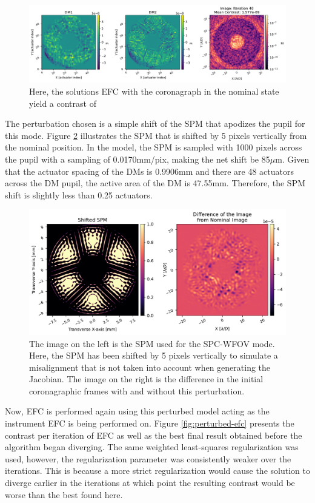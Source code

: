 \documentclass[12pt]{spieman}  %
\begin{document}
\begin{spacing}{2}
\begin{figure}[h]
    \centering
    \includegraphics[scale=0.5]{figs-efc/efc_nominal.pdf}
    \caption{Here, the solutions EFC with the coronagraph in the nominal state yield a contrast of }
    \label{fig:efc-nominal}
\end{figure}

The perturbation chosen is a simple shift of the SPM that apodizes the pupil for this mode. Figure \ref{fig:spm-perturbation} illustrates the SPM that is shifted by 5 pixels vertically from the nominal position. In the model, the SPM is sampled with 1000 pixels across the pupil with a sampling of 0.0170mm/pix, making the net shift be 85$\mu\text{m}$. Given that the actuator spacing of the DMs is 0.9906mm and there are 48 actuators across the DM pupil, the active area of the DM is 47.55mm. Therefore, the SPM shift is slightly less than 0.25 actuators. 

\begin{figure}[h]
    \centering
    \includegraphics[scale=0.5]{figs-efc/shifted_spm.pdf}
    \caption{The image on the left is the SPM used for the SPC-WFOV mode. Here, the SPM has been shifted by 5 pixels vertically to simulate a misalignment that is not taken into account when generating the Jacobian. The image on the right is the difference in the initial coronagraphic frames with and without this perturbation.}
    \label{fig:spm-perturbation}
\end{figure}

Now, EFC is performed again using this perturbed model acting as the instrument EFC is being performed on. Figure \ref{fig:perturbed-efc} presents the contrast per iteration of EFC as well as the best final result obtained before the algorithm began diverging. The same weighted least-squares regularization was used, however, the regularization parameter was consistently weaker over the iterations. This is because a more strict regularization would cause the solution to diverge earlier in the iterations at which point the resulting contrast would be worse than the best found here. 


\end{spacing}
\end{document}
